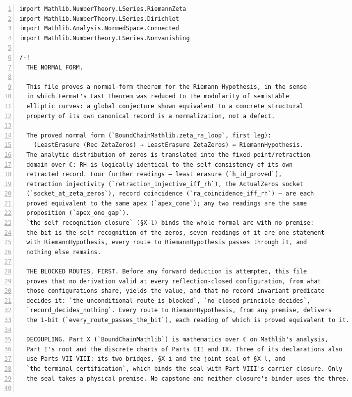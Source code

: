 \documentclass[10pt]{article}
\newcommand{\leansize}{\fontsize{5.5pt}{6.75pt}\selectfont}
\newcommand{\leanfont}{\setlength{\columnsep}{12pt}\setlength{\columnseprule}{0.3pt}\def\columnseprulecolor{\color{black!18}}\raggedcolumns}
\begin{document}
\begingroup\leanfont
\begin{multicols}{2}
\begin{Verbatim}[numbers=left,firstnumber=1,numbersep=3pt,xleftmargin=2.6em,breaklines=true,breakanywhere=true,breakautoindent=false,breakindent=1.4em,breaksymbolleft={},breakanywheresymbolpre={},fontsize=\leansize]
import Mathlib.NumberTheory.LSeries.RiemannZeta
import Mathlib.NumberTheory.LSeries.Dirichlet
import Mathlib.Analysis.NormedSpace.Connected
import Mathlib.NumberTheory.LSeries.Nonvanishing

/-!
  THE NORMAL FORM.

  This file proves a normal-form theorem for the Riemann Hypothesis, in the sense
  in which Fermat's Last Theorem was reduced to the modularity of semistable
  elliptic curves: a global conjecture shown equivalent to a concrete structural
  property of its own canonical record is a normalization, not a defect.

  The proved normal form (`BoundChainMathlib.zeta_ra_loop`, first leg):
    (LeastErasure (Rec ZetaZeros) → LeastErasure ZetaZeros) ↔ RiemannHypothesis.
  The analytic distribution of zeros is translated into the fixed-point/retraction
  domain over ℂ: RH is logically identical to the self-consistency of its own
  retracted record. Four further readings — least erasure (`h_id_proved`),
  retraction injectivity (`retraction_injective_iff_rh`), the ActualZeros socket
  (`socket_at_zeta_zeros`), record coincidence (`ra_coincidence_iff_rh`) — are each
  proved equivalent to the same apex (`apex_cone`); any two readings are the same
  proposition (`apex_one_gap`).
  `the_self_recognition_closure` (§X-l) binds the whole formal arc with no premise:
  the bit is the self-recognition of the zeros, seven readings of it are one statement
  with RiemannHypothesis, every route to RiemannHypothesis passes through it, and
  nothing else remains.

  THE BLOCKED ROUTES, FIRST. Before any forward deduction is attempted, this file
  proves that no derivation valid at every reflection-closed configuration, from what
  those configurations share, yields the value, and that no record-invariant predicate
  decides it: `the_unconditional_route_is_blocked`, `no_closed_principle_decides`,
  `record_decides_nothing`. Every route to RiemannHypothesis, from any premise, delivers
  the 1-bit (`every_route_passes_the_bit`), each reading of which is proved equivalent to it.

  DECOUPLING. Part X (`BoundChainMathlib`) is mathematics over ℂ on Mathlib's analysis,
  Part I's root and the discrete charts of Parts III and IX. Three of its declarations also
  use Parts VII–VIII: its two bridges, §X-i and the joint seal of §X-l, and
  `the_terminal_certification`, which binds the seal with Part VIII's carrier closure. Only
  the seal takes a physical premise. No capstone and neither closure's binder uses the three.


\end{Verbatim}
\end{multicols}
\end{document}
